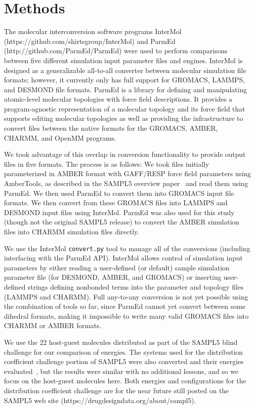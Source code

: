\section*{Methods}
\begin{sloppypar}
The molecular interconversion software programs InterMol
(https://github.com/shirtsgroup/InterMol) and ParmEd
(http://github.com/ParmEd/ParmEd) were used to perform comparisons
between five different simulation input parameter files and engines.
InterMol is designed as a generalizable all-to-all converter between
molecular simulation file formats; however, it currently only has full
support for GROMACS, LAMMPS, and DESMOND file formats.  ParmEd is
a library for defining and manipulating atomic-level molecular topologies with
force field descriptions. It provides a program-agnostic representation of a
molecular topology and its force field that supports editing molecular
topologies as well as providing the infrastructure to convert files between the
native formats for the GROMACS, AMBER, CHARMM, and OpenMM programs.
\end{sloppypar}

We took advantage of this overlap in conversion functionality to
provide output files in five formats. The process is as follows: We
took files initially parameterized in AMBER format with GAFF/RESP force field
parameters using AmberTools, as described in the SAMPL5 overview paper~\citep{SAMPL5Overview}
and read them using ParmEd. We then used ParmEd to convert them into
GROMACS input file formats. We then convert from these GROMACS files
into LAMMPS and DESMOND input files using InterMol.  ParmEd was also
used for this study (though not the original SAMPL5 release) to
convert the AMBER simulation files into CHARMM simulation files
directly.

We use the InterMol {\tt convert.py} tool to manage all of the conversions
(including interfacing with the ParmEd API). InterMol allows control
of simulation input parameters by either reading a user-defined (or
default) sample simulation parameter file (for DESMOND, AMBER, and
GROMACS) or inserting user-defined strings defining nonbonded terms
into the parameter and topology files (LAMMPS and CHARMM). Full
any-to-any conversion is not yet possible using the combination of
tools so far, since ParmEd cannot yet convert between some dihedral
formats, making it impossible to write many valid GROMACS files into
CHARMM or AMBER formats.

We use the 22 host-guest molecules distributed as part of the SAMPL5
blind challenge for our comparison of energies.  The systems used for
the distribution coefficient challenge portion of SAMPL5 were also
converted and their energies evaluated~\citep{SAMPL5_DC_Overview}, but
the results were similar with no additional lessons, and so we focus
on the host-guest molecules here.  Both energies and configurations
for the distribution coefficient challenge are for the near future
still posted on the SAMPL5 web site
(https://drugdesigndata.org/about/sampl5). 


